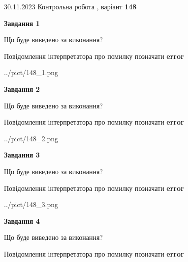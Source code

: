 \documentclass[12pt, ukrainian]{article}
\begin{document}
{{30.11.2023 Контрольна робота , варіант  \No \textbf { 148 }\par}}
{




{\begin {center}\textbf{Завдання 1}\end {center}}\par
Що буде виведено за виконання? \par
Повідомлення інтерпретатора про помилку позначати \textbf{error}

\begin{center}
	{../pict/148_1.png}
\end{center}
\newpage

{\begin {center}\textbf{Завдання 2}\end {center}}\par
Що буде виведено за виконання? \par
Повідомлення інтерпретатора про помилку позначати \textbf{error}

\begin{center}
	{../pict/148_2.png}
\end{center}
\newpage

{\begin {center}\textbf{Завдання 3}\end {center}}\par
Що буде виведено за виконання? \par
Повідомлення інтерпретатора про помилку позначати \textbf{error}

\begin{center}
	{../pict/148_3.png}
\end{center}
\newpage

{\begin {center}\textbf{Завдання 4}\end {center}}\par
Що буде виведено за виконання? \par
Повідомлення інтерпретатора про помилку позначати \textbf{error}

}
\end{document}
